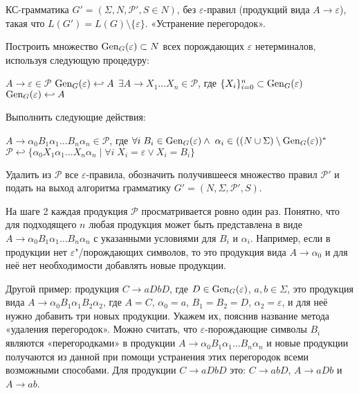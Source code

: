 {КС-грамматика $G'=(\Sigma, N, \mathcal P', S \in N)$, без
$\varepsilon$-правил (продукций вида $A \to \varepsilon$), такая что
$L(G')=L(G) \setminus \{ \varepsilon \}$.}
{«Устранение перегородок».}
{
  \item Построить множество $\operatorname{Gen}_G(\varepsilon) \subset N$ всех порождающих
  $\varepsilon$ нетерминалов, используя следующую процедуру:
  \begin{codebox}
  \li   \For $A \to \varepsilon \in \mathcal P$
  \zi   \Do
            $\operatorname{Gen}_G(\varepsilon) \hookleftarrow A$
        \End
  \li   \While $\exists A \to X_1 \ldots X_n \in \mathcal P$,
        где $\{ X_i \}_{i=0}^n \subset \operatorname{Gen}_G(\varepsilon)$
  \zi       \Do
            $\operatorname{Gen}_G(\varepsilon) \hookleftarrow A$
            \End
        \End
  \end{codebox}
  \item\label{remove-barriers} Выполнить следующие действия:
  \begin{codebox}
  \zi \For $A \to \alpha_0 B_1 \alpha_1 \ldots B_n \alpha_n \in \mathcal P$, где
  $\forall i \; B_i \in \operatorname{Gen}_G(\varepsilon) \wedge \;
  \alpha_i \in ((N \cup \Sigma) \setminus \operatorname{Gen}_G(\varepsilon))^*$
  \zi   \Do
        $\mathcal P \hookleftarrow
            \{ \alpha_0 X_1 \alpha_1 \ldots X_n \alpha_n \mid
            \forall i \; X_i = \varepsilon \vee X_i = B_i \}$
        \End
  \end{codebox}
  \item Удалить из $\mathcal P$ все $\varepsilon$-правила, обозначить
  получившееся множество правил $\mathcal P'$ и подать на выход алгоритма
  грамматику $G' = (N, \Sigma, \mathcal P', S)$.
}

\begin{myremark}
На шаге 2 каждая продукция $\mathcal P$ просматривается ровно
один раз. Понятно, что для подходящего $n$ любая продукция может быть
представлена в виде $A \to \alpha_0 B_1 \alpha_1 \ldots B_n \alpha_n$ с
указанными условиями для $B_i$ и $\alpha_i$. Например, если в продукции нет
$\varepsilon$"/порождающих символов, то это продукция вида $A \to
\alpha_0$ и для неё нет необходимости добавлять новые продукции.

Другой пример: продукция $C \to aDbD$, где $D \in \operatorname{Gen}_G(\varepsilon)$, $a, b \in
\Sigma$, это продукция вида $A \to \alpha_0 B_1 \alpha_1 B_2 \alpha_2$, где $A =
C$, $\alpha_0 = a$, $B_1 = B_2 = D$, $\alpha_2 = \varepsilon$, и для неё нужно
добавить три новых продукции. Укажем их, пояснив название метода «удаления
перегородок». Можно считать, что $\varepsilon$-порождающие символы $B_i$ являются
«перегородками» в продукции $A \to \alpha_0 B_1 \alpha_1 \ldots B_n \alpha_n$ и
новые продукции получаются из данной при помощи устранения этих перегородок всеми
возможными способами. Для продукции $C \to aDbD$ это: $C \to abD$, $A \to aDb$ и
$A \to ab$.
\end{myremark}

